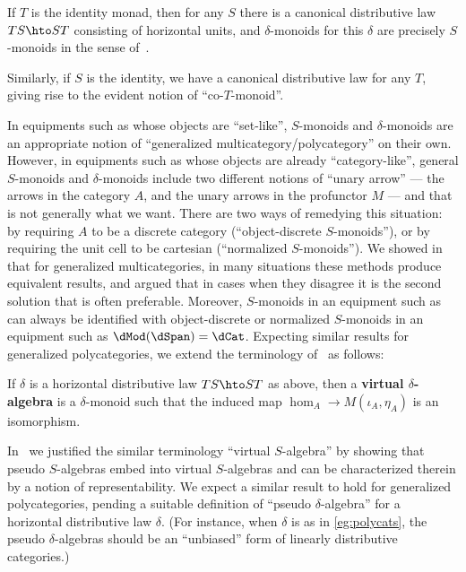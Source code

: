 \documentclass{amsart}
\begin{document}
\begin{eg}
  If $T$ is the identity monad, then for any $S$ there is a canonical distributive law $TS \hto ST$ consisting of horizontal units, and $\delta$-monoids for this $\delta$ are precisely $S$-monoids in the sense of~\cite{cs:multicats}.
\end{eg}

\begin{eg}
  Similarly, if $S$ is the identity, we have a canonical distributive law for any $T$, giving rise to the evident notion of ``co-$T$-monoid''.
\end{eg}

In equipments such as \dSpan whose objects are ``set-like'', $S$-monoids and $\delta$-monoids are an appropriate notion of ``generalized multicategory/polycategory'' on their own.
However, in equipments such as \dCat whose objects are already ``category-like'', general $S$-monoids and $\delta$-monoids include two different notions of ``unary arrow'' --- the arrows in the category $A$, and the unary arrows in the profunctor $M$ --- and that is not generally what we want.
There are two ways of remedying this situation: by requiring $A$ to be a discrete category (``object-discrete $S$-monoids''), or by requiring the unit cell to be cartesian (``normalized $S$-monoids'').
We showed in~\cite{cs:multicats} that for generalized multicategories, in many situations these methods produce equivalent results, and argued that in cases when they disagree it is the second solution that is often preferable.
Moreover, $S$-monoids in an equipment such as \dSpan can always be identified with object-discrete or normalized $S$-monoids in an equipment such as $\dMod(\dSpan) = \dCat$.
Expecting similar results for generalized polycategories, we extend the terminology of~\cite{cs:multicats} as follows:

\begin{defn}
  If $\delta$ is a horizontal distributive law $TS \hto ST$ as above, then a \textbf{virtual $\delta$-algebra} is a $\delta$-monoid such that the induced map $\hom_A \to M(\iota_A,\eta_A)$ is an isomorphism.
\end{defn}

In~\cite{cs:multicats} we justified the similar terminology ``virtual $S$-algebra'' by showing that pseudo $S$-algebras embed into virtual $S$-algebras and can be characterized therein by a notion of representability.
We expect a similar result to hold for generalized polycategories, pending a suitable definition of ``pseudo $\delta$-algebra'' for a horizontal distributive law $\delta$.
(For instance, when $\delta$ is as in \cref{eg:polycats}, the pseudo $\delta$-algebras should be an ``unbiased'' form of linearly distributive categories.)
\end{document}
